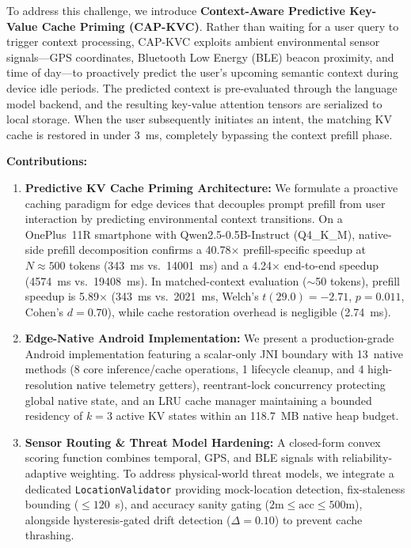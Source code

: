 \documentclass[journal]{IEEEtran}
\begin{document}
To address this challenge, we introduce \textbf{Context-Aware Predictive Key-Value Cache Priming (CAP-KVC)}. Rather than waiting for a user query to trigger context processing, CAP-KVC exploits ambient environmental sensor signals---GPS coordinates, Bluetooth Low Energy (BLE) beacon proximity, and time of day---to proactively predict the user's upcoming semantic context during device idle periods. The predicted context is pre-evaluated through the language model backend, and the resulting key-value attention tensors are serialized to local storage. When the user subsequently initiates an intent, the matching KV cache is restored in under 3~ms, completely bypassing the context prefill phase.

\textbf{Contributions:}

\begin{enumerate}
    \item \textbf{Predictive KV Cache Priming Architecture:} We formulate a proactive caching paradigm for edge devices that decouples prompt prefill from user interaction by predicting environmental context transitions. On a OnePlus~11R smartphone with Qwen2.5-0.5B-Instruct (Q4\_K\_M), native-side prefill decomposition confirms a 40.78$\times$ prefill-specific speedup at $N \approx 500$ tokens (343~ms vs.\ 14001~ms) and a 4.24$\times$ end-to-end speedup (4574~ms vs.\ 19408~ms). In matched-context evaluation ($\sim$50 tokens), prefill speedup is 5.89$\times$ (343~ms vs.\ 2021~ms, Welch's $t(29.0) = -2.71$, $p = 0.011$, Cohen's $d = 0.70$), while cache restoration overhead is negligible (2.74~ms).
    
    \item \textbf{Edge-Native Android Implementation:} We present a production-grade Android implementation featuring a scalar-only JNI boundary with 13~native methods (8 core inference/cache operations, 1 lifecycle cleanup, and 4 high-resolution native telemetry getters), reentrant-lock concurrency protecting global native state, and an LRU cache manager maintaining a bounded residency of $k = 3$ active KV states within an 118.7~MB native heap budget.
    
    \item \textbf{Sensor Routing \& Threat Model Hardening:} A closed-form convex scoring function combines temporal, GPS, and BLE signals with reliability-adaptive weighting. To address physical-world threat models, we integrate a dedicated \texttt{LocationValidator} providing mock-location detection, fix-staleness bounding ($\le 120$~s), and accuracy sanity gating ($2\text{m} \le \text{acc} \le 500\text{m}$), alongside hysteresis-gated drift detection ($\Delta = 0.10$) to prevent cache thrashing.
    

\end{enumerate}
\end{document}
